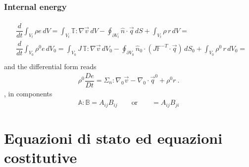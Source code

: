 \documentclass[letterpaper,10pt,english]{jupyterBook}
\begin{document}
\subsection{Internal energy}
\label{\detokenize{ch/continuum/balance-reference-integral:internal-energy}}\label{\detokenize{ch/continuum/balance-reference-integral:continuum-governing-equations-reference-integral-internal-energy}}\begin{equation*}
\begin{split}\begin{aligned}
  & \dfrac{d}{d t} \int_{V_t} \rho e \, dV = \int_{V_t} \mathbb{T} : \nabla \vec{v} \, dV - \oint_{\partial V_t} \hat{n} \cdot \vec{q} \, dS + \int_{V_t} \rho \, r \, dV = \\
  & \dfrac{d}{d t} \int_{V_0} \rho^0 e \, dV_0 = \int_{V_0} J \, \mathbb{T} : \nabla \vec{v} \, dV_0 - \oint_{\partial V_0} \hat{n}_0 \cdot \left( J \mathbb{F}^{-T} \cdot \vec{q} \right) \, dS_0 + \int_{V_0} \rho^0 \, r \, dV_0 = \\
\end{aligned}\end{split}
\end{equation*}
\sphinxAtStartPar
and the differential form reads
\begin{equation*}
\begin{split}\rho^0 \dfrac{D e}{Dt} = \mathbb{\Sigma}_n : \nabla_0 \vec{v} - \nabla_0 \cdot \vec{q}^0 + \rho^0 r \ .\end{split}
\end{equation*}
\sphinxAtStartPar
{} , in components
\begin{equation*}
\begin{split}\mathbb{A} : \mathbb{B} = A_{ij} B_{ij} \qquad \text{or} \qquad = A_{ij} B_{ji}\end{split}
\end{equation*}
\sphinxstepscope


\chapter{Equazioni di stato ed equazioni costitutive}
\label{\detokenize{ch/continuum/constitutive-equations:equazioni-di-stato-ed-equazioni-costitutive}}\label{\detokenize{ch/continuum/constitutive-equations:continuum-constitutive-equations}}\label{\detokenize{ch/continuum/constitutive-equations::doc}}
\sphinxstepscope
\end{document}
